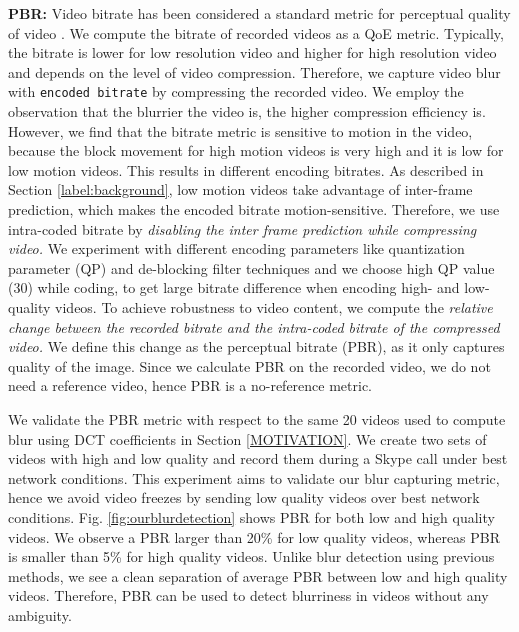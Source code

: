 \noindent \noindent \textbf{PBR:} 
Video bitrate has been considered a standard metric for perceptual quality of video \cite{zhang2012profiling, chakraborty2016exbox}.
We compute the bitrate of recorded videos as a QoE metric. Typically, the bitrate is lower for low resolution video and higher for high resolution video and depends on the level of video compression.
Therefore, we capture video blur with \texttt{encoded bitrate} by compressing the recorded video. 
We employ the observation that the blurrier the video is, the higher compression efficiency is. 
However, we find that the bitrate metric is sensitive to motion in the video, because the block movement for high motion videos is very high and it is low for low motion videos. This results in different encoding bitrates. 
As described in Section \ref{label:background}, low motion videos take advantage of inter-frame prediction, which makes the encoded bitrate motion-sensitive. 
Therefore, we use intra-coded bitrate by \emph{disabling the inter frame prediction while compressing video.}
We experiment with different encoding parameters like quantization parameter (QP) and de-blocking filter techniques and we choose high QP value (30) while coding, to get large bitrate difference when encoding high- and low-quality videos. 
To achieve robustness to video content, we compute the \emph{relative change between the recorded bitrate and  the intra-coded bitrate of the compressed video.} We define this change as the perceptual bitrate (PBR), as it only captures quality of the image. Since we calculate PBR on the recorded video, we do not need a reference video, hence PBR is a no-reference metric.

We validate the PBR metric with respect to the same 20 videos used to compute blur using DCT coefficients in Section \ref{MOTIVATION}.
We create two sets of videos with high and low quality and record them during a Skype call under best network conditions.
This experiment aims to validate our blur capturing metric, hence we avoid video freezes by sending low quality videos over best network conditions.
Fig. \ref{fig:ourblurdetection} shows PBR for both low and high quality videos.
We observe a PBR larger than 20\% for low quality videos, whereas PBR is smaller than 5\%  for high quality videos.
Unlike blur detection using previous methods, we see a clean separation of average PBR between low and high quality videos. Therefore, PBR can be used to detect blurriness in videos without any ambiguity.


